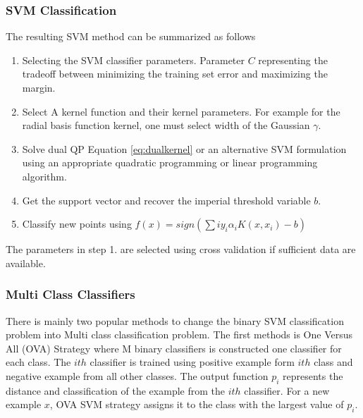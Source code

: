  
\subsubsection{SVM  Classification}
The resulting SVM method can be summarized as follows 
\begin{enumerate}
	\item Selecting the SVM classifier parameters. Parameter $C$ representing the tradeoff between minimizing the training set error and maximizing the margin. 
	\item Select A kernel function and their kernel parameters. For example for the radial basis function kernel, one must select width of the Gaussian $\gamma$. 
	\item Solve dual QP Equation \ref{eq:dualkernel} or an alternative SVM formulation using an appropriate quadratic programming or linear programming algorithm. 
	\item Get the support vector and recover the imperial threshold  variable $b$. 
	\item Classify new points using $f(x)=sign\left(\sum{i}y_i\alpha_i K\left(x,x_i\right)-b\right)$
\end{enumerate}
The parameters in step 1. are selected using cross validation if sufficient data are available. %
\subsubsection {Multi Class Classifiers}
 
 There is mainly two popular methods to change the binary SVM classification problem into Multi class classification problem. The first methods is One Versus All (OVA) Strategy where M binary classifiers is constructed one classifier for each class.  The $ith$ classifier is trained using positive example form $ith$ class and negative example from all other classes. The output function $p_i$ represents the distance and classification of the example from the $ith$ classifier. For a new example $x$, OVA SVM strategy assigns it to the class with the largest value of $p_i$. 
 
